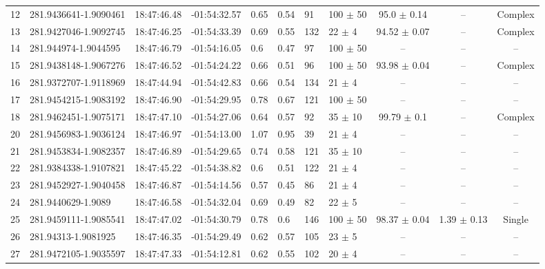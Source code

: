 \documentclass[longauth]{aa} %
\begin{document}
\begin{appendix}
\begin{table}[htbp!]
\begin{tabular}{llllllllccc}
12  &  281.9436641-1.9090461  &  18:47:46.48  &  -01:54:32.57  &  0.65  &  0.54  &  91  &  100 $\pm$ 50  &  95.0 $\pm$ 0.14  &  --  &  Complex \\
13  &  281.9427046-1.9092745  &  18:47:46.25  &  -01:54:33.39  &  0.69  &  0.55  &  132  &  22 $\pm$ 4  &  94.52 $\pm$ 0.07  &  --  &  Complex \\
14  &  281.944974-1.9044595  &  18:47:46.79  &  -01:54:16.05  &  0.6  &  0.47  &  97  &  100 $\pm$ 50  &  --  &  --  &  -- \\
15  &  281.9438148-1.9067276  &  18:47:46.52  &  -01:54:24.22  &  0.66  &  0.51  &  96  &  100 $\pm$ 50  &  93.98 $\pm$ 0.04  &  --  &  Complex \\
16  &  281.9372707-1.9118969  &  18:47:44.94  &  -01:54:42.83  &  0.66  &  0.54  &  134  &  21 $\pm$ 4  &  --  &  --  &  -- \\
17  &  281.9454215-1.9083192  &  18:47:46.90  &  -01:54:29.95  &  0.78  &  0.67  &  121  &  100 $\pm$ 50  &  --  &  --  &  -- \\
18  &  281.9462451-1.9075171  &  18:47:47.10  &  -01:54:27.06  &  0.64  &  0.57  &  92  &  35 $\pm$ 10  &  99.79 $\pm$ 0.1  &  --  &  Complex \\
20  &  281.9456983-1.9036124  &  18:47:46.97  &  -01:54:13.00  &  1.07  &  0.95  &  39  &  21 $\pm$ 4  &  --  &  --  &  -- \\
21  &  281.9453834-1.9082357  &  18:47:46.89  &  -01:54:29.65  &  0.74  &  0.58  &  121  &  35 $\pm$ 10  &  --  &  --  &  -- \\
22  &  281.9384338-1.9107821  &  18:47:45.22  &  -01:54:38.82  &  0.6  &  0.51  &  122  &  21 $\pm$ 4  &  --  &  --  &  -- \\
23  &  281.9452927-1.9040458  &  18:47:46.87  &  -01:54:14.56  &  0.57  &  0.45  &  86  &  21 $\pm$ 4  &  --  &  --  &  -- \\
24  &  281.9440629-1.9089  &  18:47:46.58  &  -01:54:32.04  &  0.69  &  0.49  &  82  &  22 $\pm$ 5  &  --  &  --  &  -- \\
25  &  281.9459111-1.9085541  &  18:47:47.02  &  -01:54:30.79  &  0.78  &  0.6  &  146  &  100 $\pm$ 50  &  98.37 $\pm$ 0.04  &  1.39 $\pm$ 0.13  &  Single \\
26  &  281.94313-1.9081925  &  18:47:46.35  &  -01:54:29.49  &  0.62  &  0.57  &  105  &  23 $\pm$ 5  &  --  &  --  &  -- \\
27  &  281.9472105-1.9035597  &  18:47:47.33  &  -01:54:12.81  &  0.62  &  0.55  &  102  &  20 $\pm$ 4  &  --  &  --  &  -- \\

\end{tabular}
\end{table}
\end{appendix}
\end{document}
